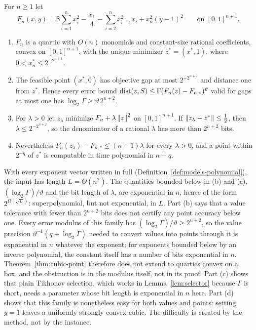 \begin{proposition}\label{prop:points-regularization}
For $n\ge1$ let
\[
 F_n(x,y)=8\sum_{i=1}^nx_i^2-\frac{x_1}4-\sum_{i=2}^nx_{i-1}^2x_i+x_n^2(y-1)^2
 \qquad\text{on }[0,1]^{n+1}.
\]
\begin{enumerate}[label=(\alph*)]
\item $F_n$ is a quartic with $O(n)$ monomials and constant-size rational
coefficients, convex on $[0,1]^{n+1}$, with the unique minimizer
$z^*=(x^*,1)$, where $0<x_n^*\le2^{-2^{n+1}}$.
\item The feasible point $(x^*,0)$ has objective gap at most
$2^{-2^{n+2}}$ and distance one from $z^*$. Hence every error bound
$\operatorname{dist}(z,S)\le\Gamma(F_n(z)-F_{n,*})^\vartheta$ valid for gaps at most one has
$\log_2\Gamma\ge\vartheta\,2^{n+2}$.
\item For $\lambda>0$ let $z_\lambda$ minimize $F_n+\lambda\left\lVert z\right\rVert^2$ on
$[0,1]^{n+1}$. If $\left\lVert z_\lambda-z^*\right\rVert\le\frac12$, then
$\lambda\le2^{-2^{n+2}}$, so the denominator of a rational $\lambda$ has more
than $2^{n+2}$ bits.
\item Nevertheless $F_n(z_\lambda)-F_{n,*}\le(n+1)\lambda$ for every
$\lambda>0$, and a point within $2^{-q}$ of $z^*$ is computable in time
polynomial in $n+q$.
\end{enumerate}
\end{proposition}

With every exponent vector written in full
(Definition~\ref{def:models-polynomial}), the input has length
$L=\Theta(n^2)$. The quantities bounded below in (b) and (c),
$(\log_2\Gamma)/\vartheta$ and the bit length of $\lambda$, are exponential in
$n$, hence of the form $2^{\Omega(\sqrt L)}$: superpolynomial, but not
exponential, in $L$. Part (b) says that a value tolerance with fewer than
$2^{n+2}$ bits does not certify any point accuracy below one. Every error
modulus of this family has $(\log_2\Gamma)/\vartheta\ge2^{n+2}$, so the value
precision $\vartheta^{-1}(q+\log_2\Gamma)$ needed to convert values into points
through it is exponential in $n$ whatever the exponent; for exponents bounded
below by an inverse polynomial, the constant itself has a number of bits
exponential in $n$. Theorem~\ref{thm:cubic-point} therefore does not extend to
quartics convex on a box, and the obstruction is in the modulus itself, not in
its proof. Part (c) shows that plain Tikhonov selection, which works in
Lemma~\ref{lem:selector} because $\Gamma$ is short, needs a parameter whose
bit length is exponential in $n$ here. Part (d) shows that this family is
nonetheless easy for both values and points: setting $y=1$ leaves a
uniformly strongly convex cubic. The difficulty is created by the method,
not by the instance.

